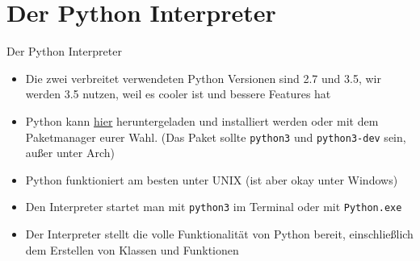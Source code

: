 \section{Der Python Interpreter}
\begin{frame}{Der Python Interpreter}
	\begin{itemize}
    	\item Die zwei verbreitet verwendeten Python Versionen sind 2.7 und 3.5, wir werden 3.5 nutzen, weil es cooler ist und bessere Features hat
		\item Python kann \textcolor{blue}{\href{http://www.python.org}{hier}} heruntergeladen und installiert werden oder mit dem Paketmanager eurer Wahl. (Das Paket sollte \texttt{python3} und \texttt{python3-dev} sein, außer unter Arch)
    	\item Python funktioniert am besten unter UNIX (ist aber okay unter Windows)
    	\item Den Interpreter startet man mit \texttt{python3} im Terminal oder mit \texttt{Python.exe}
    	\item Der Interpreter stellt die volle Funktionalität von Python bereit, einschließlich dem Erstellen von Klassen und Funktionen
	\end{itemize}
\end{frame}

